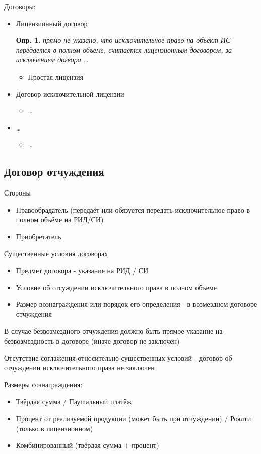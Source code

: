 \documentclass[12pt]{article}
\newtheorem{definition}{Опр.}
\begin{document}
Договоры:
\begin{itemize}
  \item Лицензионный договор
  \begin{definition}
    прямо не указано, что исключительное право на объект ИС передается в полном объеме, считается лицензионным договором, за исключением догвора \dots
  \end{definition}
  \begin{itemize}
    \item Простая лицензия
  \end{itemize} 
  \item Договор исключительной лицензии
  \begin{itemize}
    \item \dots
  \end{itemize}
  \item \dots
  \begin{itemize}
    \item \dots
  \end{itemize}
\end{itemize}

\subsection{Договор отчуждения}

Стороны
\begin{itemize}
  \item Правообрадатель (передаёт или обязуется передать исключительное право в полном объёме на РИД/СИ)
  \item Приобретатель
\end{itemize}

Существенные условия договорах
\begin{itemize}
  \item Предмет договора - указание на РИД / СИ
  \item Условие об отсуждении исключительного права в полном объеме
  \item Размер вознаграждения или порядок его определения - в возмездном договоре отчуждения
\end{itemize}

В случае безвозмездного отчуждения должно быть прямое указание на безвозмездность
в договоре (иначе договор не заключен)

Отсутствие соглажения относительно существенных условий - договор об отчуждении исключительного права не заключен

Размеры сознаграждения:
\begin{itemize}
  \item Твёрдая сумма / Паушальный платёж
  \item Процент от реализуемой продукции (может быть при отчуждении) / Роялти (только в лицензионном)
  \item Комбинированный (твёрдая сумма + процент) 
\end{itemize}
\end{document}
